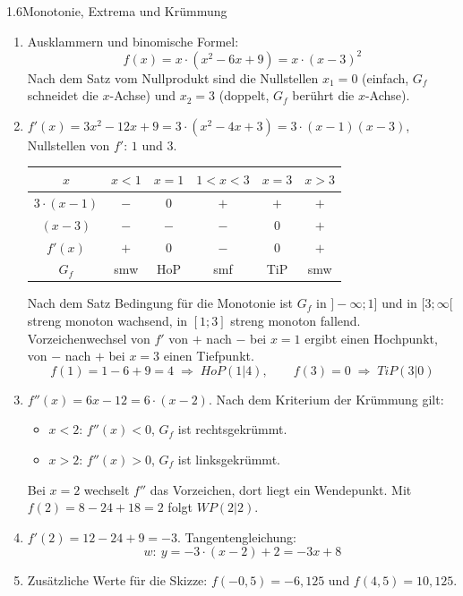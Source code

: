 \begin{loesung}{1.6}{Monotonie, Extrema und Krümmung}
\begin{enumerate}[label=\alph*)]
  \item Ausklammern und binomische Formel:
  \[f(x) = x\cdot(x^2-6x+9) = x\cdot(x-3)^2\]
  Nach dem Satz vom Nullprodukt sind die Nullstellen $x_1=0$ (einfach, $G_f$ schneidet die $x$-Achse) und $x_2=3$ (doppelt, $G_f$ berührt die $x$-Achse).
  \item $f'(x) = 3x^2-12x+9 = 3\cdot(x^2-4x+3) = 3\cdot(x-1)(x-3)$, Nullstellen von $f'$: $1$ und $3$.
  \begin{center}\begin{tabular}{||c|c|c|c|c|c||}
    \hline
    $x$ & $x<1$ & $x=1$ & $1<x<3$ & $x=3$ & $x>3$\\
    \hline\hline
    $3\cdot(x-1)$ & $-$ & $0$ & $+$ & $+$ & $+$\\
    \hline
    $(x-3)$ & $-$ & $-$ & $-$ & $0$ & $+$\\
    \hline
    $f'(x)$ & $+$ & $0$ & $-$ & $0$ & $+$\\
    \hline
    $G_f$ & smw & HoP & smf & TiP & smw\\
    \hline
  \end{tabular}\end{center}
  Nach dem Satz \glqq Bedingung für die Monotonie\grqq{} ist $G_f$ in $]-\infty;1]$ und in $[3;\infty[$ streng monoton wachsend, in $[1;3]$ streng monoton fallend. Vorzeichenwechsel von $f'$ von $+$ nach $-$ bei $x=1$ ergibt einen Hochpunkt, von $-$ nach $+$ bei $x=3$ einen Tiefpunkt.
  \[f(1) = 1-6+9 = 4 \;\Longrightarrow\; HoP(1|4),\qquad f(3) = 0 \;\Longrightarrow\; TiP(3|0)\]
  \item $f''(x) = 6x-12 = 6\cdot(x-2)$. Nach dem Kriterium der Krümmung gilt:
  \begin{itemize}
    \item $x<2$: $f''(x)<0$, $G_f$ ist rechtsgekrümmt.
    \item $x>2$: $f''(x)>0$, $G_f$ ist linksgekrümmt.
  \end{itemize}
  Bei $x=2$ wechselt $f''$ das Vorzeichen, dort liegt ein Wendepunkt. Mit $f(2) = 8-24+18 = 2$ folgt $WP(2|2)$.
  \item $f'(2) = 12-24+9 = -3$. Tangentengleichung:
  \[w:\ y = -3\cdot(x-2)+2 = -3x+8\]
  \item Zusätzliche Werte für die Skizze: $f(-0{,}5) = -6{,}125$ und $f(4{,}5) = 10{,}125$.
  \begin{center}
  \begin{tikzpicture}

\end{tikzpicture}
\end{center}
\end{enumerate}
\end{loesung}

